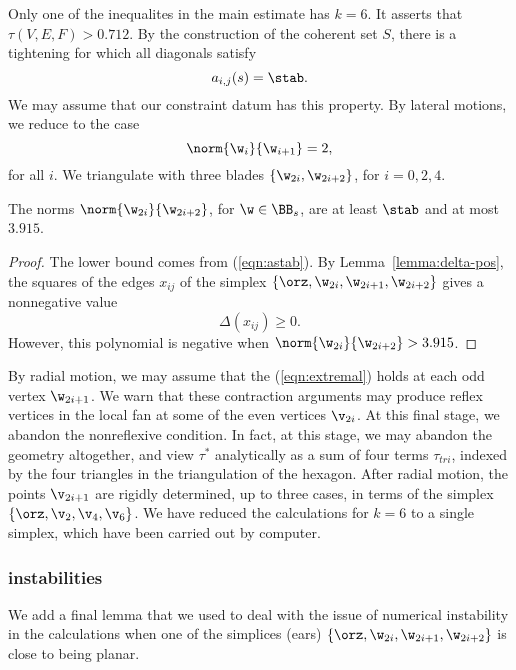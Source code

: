 Only one of the inequalites in the main estimate has $k=6$.  It
asserts that $\tau(V,E,F) > 0.712$.  By the construction of the
coherent set $S$, there is a tightening for which all diagonals
satisfy
\begin{equation}\label{eqn:astab}
a_{i,j}(s)=\stab.
\end{equation}  
We may assume that our constraint datum
has this property.
By lateral motions, we reduce to the case
\[
\norm{\w_i}{\w_{i+1}}=2,
\]
for all $i$.  We triangulate with three blades
$\{\w_{2i},\w_{2i+2}\}$, for $i=0,2,4$.

\begin{lemma}
The norms $\norm{\w_{2i}}{\w_{2i+2}}$, for $\w\in \BB_s$, 
are at least $\stab$ and at most $3.915$.
\end{lemma}

\begin{proof}
  The lower bound comes from (\ref{eqn:astab}).  By
  Lemma~\ref{lemma:delta-pos}, the squares of the edges $x_{ij}$ of
  the simplex $\{\orz,\w_{2i},\w_{2i+1},\w_{2i+2}\}$ gives a
  nonnegative value
\[
\Delta(x_{ij})\ge 0.
\]
However, this polynomial is  negative when
$\norm{\w_{2i}}{\w_{2i+2}} > 3.915$.
\end{proof}

By radial motion, we may assume that the (\ref{eqn:extremal}) holds at
each odd vertex $\w_{2i+1}$.  We warn that these contraction arguments
may produce reflex vertices in the local fan at some of the even
vertices $\v_{2i}$.  At this final stage, we abandon the nonreflexive
condition.  In fact, at this stage, we may abandon the geometry
altogether, and view $\tau^*$ analytically as a sum of four terms
$\tau_{tri}$, indexed by the four triangles in the triangulation of
the hexagon.  After radial motion, the points $\v_{2i+1}$ are rigidly
determined, up to three cases, in terms of the simplex
$\{\orz,\v_2,\v_4,\v_6\}$.  We have reduced the calculations for $k=6$
to a single simplex, which have been carried out by computer.

\subsubsection{instabilities}

We add a final lemma that we used to deal with the issue of numerical
instability in the calculations when one of the simplices (ears)
$\{\orz,\w_{2i},\w_{2i+1},\w_{2i+2}\}$ is close to being planar.

